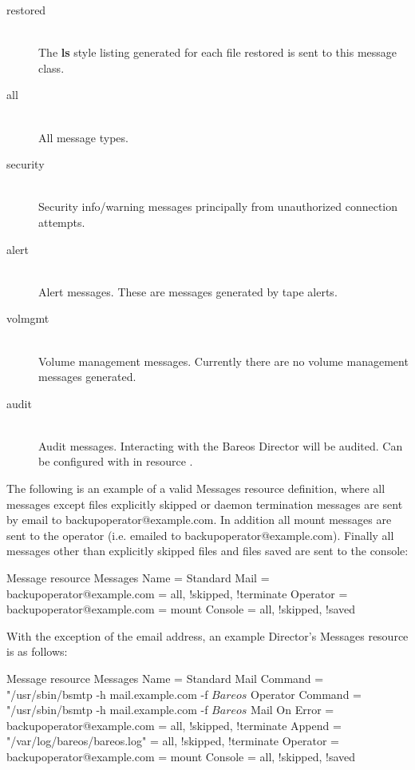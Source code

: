 \begin{description}
\item [restored] \hfill \\
The {\bf ls} style listing generated for each file restored is sent to
this message class.

\item [all] \hfill \\
All message types.

\item [security] \hfill \\
Security info/warning messages principally from unauthorized
connection attempts.

\item [alert] \hfill \\
Alert messages. These are messages generated by tape alerts.

\item [volmgmt] \hfill \\
Volume management messages. Currently there are no volume management
messages generated.

\item [audit] \hfill \\
Audit messages. Interacting with the Bareos Director will be audited.
Can be configured with in resource .

\end{description}

The following is an example of a valid Messages resource definition, where
all messages except files explicitly skipped or daemon termination messages
are sent by email to backupoperator@example.com.  In addition all mount messages
are sent to the operator (i.e.  emailed to backupoperator@example.com).  Finally
all messages other than explicitly skipped files and files saved are sent
to the console:

\begin{bconfig}{Message resource}
Messages {
  Name = Standard
  Mail = backupoperator@example.com = all, !skipped, !terminate
  Operator = backupoperator@example.com = mount
  Console = all, !skipped, !saved
}
\end{bconfig}

With the exception of the email address,
an example Director's Messages resource is as follows:

\begin{bconfig}{Message resource}
Messages {
  Name = Standard
  Mail Command = "/usr/sbin/bsmtp -h mail.example.com  -f \"\(Bareos\) %
  Operator Command = "/usr/sbin/bsmtp -h mail.example.com -f \"\(Bareos\) %
  Mail On Error = backupoperator@example.com = all, !skipped, !terminate
  Append = "/var/log/bareos/bareos.log" = all, !skipped, !terminate
  Operator = backupoperator@example.com = mount
  Console = all, !skipped, !saved
}
\end{bconfig}
